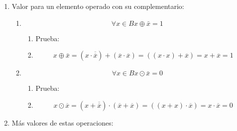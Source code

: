 \begin{enumerate}
\begin{enumerate}
\begin{enumerate}
      \begin{enumerate}
      \def\labelenumiv{\arabic{enumiv}.}
      \item
        Para la operación ``exor'' :
        \[\forall{x \in B}x \oplus {x = 0}\]

        \begin{enumerate}
        \def\labelenumv{\arabic{enumv}.}
        \tightlist
        \item
          Prueba:
        \item
          \[x \oplus {{{x = {{({x \cdot \overline{x}})} + {({\overline{x} \cdot x})}}} = {0 + 0}} = 0}\]
        \end{enumerate}
      \item
        Para la operación ``exnor'': \[\forall{x \in B}x \odot {x = 1}\]

        \begin{enumerate}
        \def\labelenumv{\arabic{enumv}.}
        \tightlist
        \item
          Prueba:
        \item
          \[x \odot {{{x = {{({x + \overline{x}})} \cdot {({\overline{x} + x})}}} = {1 \cdot 1}} = 1}\]
        \end{enumerate}
      \end{enumerate}
    \item
      Valor para un elemento operado con su complementario:

      \begin{enumerate}
      \def\labelenumiv{\arabic{enumiv}.}
      \item
        \[\forall{x \in B}x \oplus {\bar{x} = 1}\]

        \begin{enumerate}
        \def\labelenumv{\arabic{enumv}.}
        \tightlist
        \item
          Prueba:
        \item
          \[x \oplus {{{{\bar{x} = {{({x \cdot \overline{\overline{x}}})} + {({\overline{x} \cdot \overline{x}})}}} = {({{({x \cdot x})} + \overline{x}})}} = {x + \overline{x}}} = 1}\]
        \end{enumerate}
      \item
        \[\forall{x \in B}x \odot {\bar{x} = 0}\]

        \begin{enumerate}
        \def\labelenumv{\arabic{enumv}.}
        \tightlist
        \item
          Prueba:
        \item
          \[x \odot {{{{\overline{x} = {{({x + \overline{\overline{x}}})} \cdot {({\overline{x} + \overline{x}})}}} = {({{({x + x})} \cdot \overline{x}})}} = {x \cdot \overline{x}}} = 0}\]
        \end{enumerate}
      \end{enumerate}
    \item
      Más valores de estas operaciones:


\end{enumerate}
\end{enumerate}
\end{enumerate}

